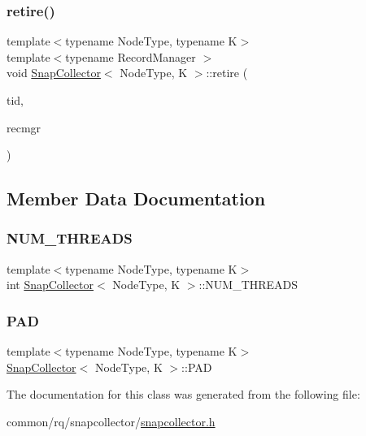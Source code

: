 \subsubsection{\texorpdfstring{retire()}{retire()}}
{\footnotesize\ttfamily template$<$typename Node\+Type, typename K$>$ \\
template$<$typename Record\+Manager $>$ \\
void \hyperlink{classSnapCollector}{Snap\+Collector}$<$ Node\+Type, K $>$\+::retire (\begin{DoxyParamCaption}\item[{const int}]{tid,  }\item[{Record\+Manager $\ast$}]{recmgr }\end{DoxyParamCaption})\hspace{0.3cm}{\ttfamily [inline]}}



\subsection{Member Data Documentation}
\mbox{\label{classSnapCollector_a8c45790cee8b96758a8e98d7d7c8faf7}} 
\subsubsection{\texorpdfstring{N\+U\+M\+\_\+\+T\+H\+R\+E\+A\+DS}{NUM\_THREADS}}
{\footnotesize\ttfamily template$<$typename Node\+Type, typename K$>$ \\
int \hyperlink{classSnapCollector}{Snap\+Collector}$<$ Node\+Type, K $>$\+::N\+U\+M\+\_\+\+T\+H\+R\+E\+A\+DS}

\mbox{\label{classSnapCollector_a1e71ab6f1d3af03e0042459d31a98b95}} 
\subsubsection{\texorpdfstring{P\+AD}{PAD}}
{\footnotesize\ttfamily template$<$typename Node\+Type, typename K$>$ \\
\hyperlink{classSnapCollector}{Snap\+Collector}$<$ Node\+Type, K $>$\+::P\+AD}



The documentation for this class was generated from the following file\+:\begin{DoxyCompactItemize}
\item 
common/rq/snapcollector/\hyperlink{snapcollector_8h}{snapcollector.\+h}\end{DoxyCompactItemize}
